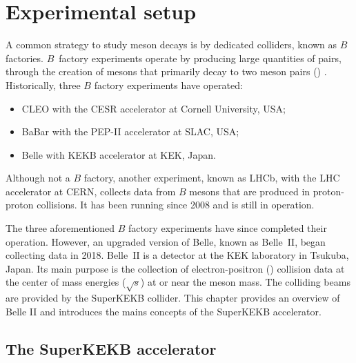\chapter{Experimental setup}

A common strategy to study \B meson decays is by dedicated colliders, known as $B$ factories.
$B$~factory experiments operate by producing large quantities of \BB pairs, through the creation of \FourS mesons that primarily decay to two \B meson pairs (\BB) \cite{Workman:2022ynf}.
Historically, three $B$ factory experiments have operated:
\begin{itemize}
    \item CLEO with the CESR accelerator at Cornell University, USA;
    \item BaBar with the PEP-II accelerator at SLAC, USA;
    \item Belle with KEKB accelerator at KEK, Japan.
\end{itemize}
Although not a $B$ factory, another experiment, known as LHCb, with the LHC accelerator at CERN, collects data from $B$ mesons that are produced in proton-proton collisions.
It has been running since 2008 and is still in operation.

The three aforementioned $B$ factory experiments have since completed their operation.
However, an upgraded version of Belle, known as Belle~II, began collecting data in 2018.
Belle~II is a detector at the KEK laboratory in Tsukuba, Japan.
Its main purpose is the collection of electron-positron (\epem) collision data 
at the center of mass energies ($\sqrt{s}$) at or near the \FourS meson mass.
The colliding beams are provided by the SuperKEKB \epem collider.
This chapter provides an overview of Belle II and introduces the mains concepts of the SuperKEKB accelerator.


\section{The SuperKEKB accelerator}\label{sec:superkekb}

